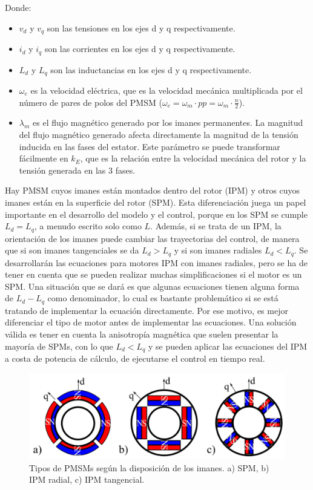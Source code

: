 Donde:
\begin{itemize}
    \item \(v_d\) y \(v_q\) son las tensiones en los ejes d y q respectivamente.
    \item \(i_d\) y \(i_q\) son las corrientes en los ejes d y q respectivamente.
    \item \(L_d\) y \(L_q\) son las inductancias en los ejes d y q respectivamente.
    \item \(\omega_e\) es la velocidad eléctrica, que es la velocidad mecánica multiplicada por el número de pares de polos del PMSM (\(\omega_e = \omega_m \cdot pp = \omega_m \cdot \frac{n}{2}\)).
    \item \(\lambda_m\) es el flujo magnético generado por los imanes permanentes. La magnitud del flujo magnético generado afecta directamente la magnitud de la tensión inducida en las fases del estator. Este parámetro se puede transformar fácilmente en \(k_E\), que es la relación entre la velocidad mecánica del rotor y la tensión generada en las 3 fases.
\end{itemize}


Hay PMSM cuyos imanes están montados dentro del rotor (IPM) y otros cuyos imanes están en la superficie del rotor (SPM). Esta diferenciación juega un papel importante en el desarrollo del modelo y el control, porque en los SPM se cumple \(L_d = L_q\), a menudo escrito solo como \(L\). Además, si se trata de un IPM, la orientación de los imanes puede cambiar las trayectorias del control, de manera que si son imanes tangenciales se da \(L_d > L_q\) y si son imanes radiales \(L_d < L_q\). Se desarrollarán las ecuaciones para motores IPM con imanes radiales, pero se ha de tener en cuenta que se pueden realizar muchas simplificaciones si el motor es un SPM. Una situación que se dará es que algunas ecuaciones tienen alguna forma de \(L_d - L_q\) como denominador, lo cual es bastante problemático si se está tratando de implementar la ecuación directamente. Por ese motivo, es mejor diferenciar el tipo de motor antes de implementar las ecuaciones. Una solución válida es tener en cuenta la anisotropía magnética que suelen presentar la mayoría de SPMs, con lo que \(L_d < L_q\) y se pueden aplicar las ecuaciones del IPM a costa de potencia de cálculo, de ejecutarse el control en tiempo real.

\begin{figure}[H]
	\centering
	\includegraphics[width=0.7\linewidth]{fig/motor-types}
	\caption{Tipos de PMSMs según la disposición de los imanes. a) SPM, b) IPM radial, c) IPM tangencial.}
\end{figure}


